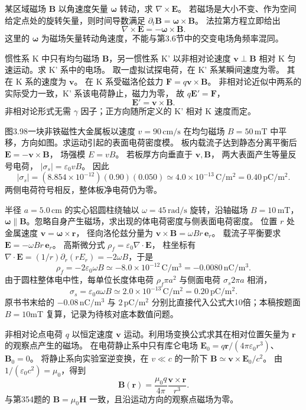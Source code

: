 某区域磁场 $\bm B$ 以角速度矢量 $\bm\omega$ 转动，求 $\nabla\times\bm E$。
\exsolution
若磁场是大小不变、作为空间给定点处的旋转矢量，则时间导数满足
$\partial_t\bm B=\bm\omega\times\bm B$。
法拉第方程立即给出
\[
\boxed{\nabla\times\bm E
=-\bm\omega\times\bm B}.
\]
\excheck 这里的 $\bm\omega$ 为磁场矢量转动角速度，不能与第3.6节中的交变电场角频率混同。

惯性系 K 中只有均匀磁场 $\bm B$，另一惯性系 K' 以非相对论速度 $\bm v\perp\bm B$ 相对 K 匀速运动。求 K' 系中的电场。
\exsolution
取一虚拟试探电荷，在 K' 系某瞬间速度为零。
其在 K 系的速度为 $\bm v$。
在 K 系受磁洛伦兹力
$\bm F=q\bm v\times\bm B$。
非相对论近似中两系的实际受力一致，K' 系该电荷静止，磁力为零，
故 $q\bm E'=\bm F$，
\[
\boxed{\bm E'=\bm v\times\bm B}.
\]
\excheck 非相对论形式无需 $\gamma$ 因子；正方向随所定义的 K' 相对 K 速度而定。

图3.98一块非铁磁性大金属板以速度
$v=90\,\mathrm{cm/s}$ 在均匀磁场
$B=50\,\mathrm{mT}$ 中平移，方向如图。求运动引起的表面电荷密度模。
\exsolution
板内载流子达到静态分离平衡后
$\bm E=-\bm v\times\bm B$，
场强模 $E=vB$。
若板厚方向垂直于 $\bm v,\bm B$，
两大表面产生等量反号电荷，
$|\sigma_s|=\varepsilon_0vB$。
因此
\[
\boxed{|\sigma_s|=
(8.854\times10^{-12})(0.90)(0.050)
\simeq4.0\times10^{-13}\,\mathrm{C/m^2}
=0.40\,\mathrm{pC/m^2}}.
\]
\excheck 两侧电荷符号相反，整体板净电荷仍为零。

半径 $a=5.0\,\mathrm{cm}$ 的实心铝圆柱绕轴以 $\omega=45\,\mathrm{rad/s}$ 旋转，沿轴磁场
$B=10\,\mathrm{mT}$，$\bm\omega\parallel\bm B$。忽略自身产生磁场，求出现的体电荷密度与侧表面电荷密度。
\exsolution
位置 $r$ 处金属速度
$\bm v=\bm\omega\times\bm r$，
径向洛伦兹分量为
$\bm v\times\bm B=\omega Br\,\bm e_r$。
载流子平衡要求
$\bm E=-\omega Br\,\bm e_r$。
高斯微分式
$\rho_f=\varepsilon_0\nabla\cdot\bm E$，
柱坐标有
$\nabla\cdot\bm E=(1/r)\partial_r(rE_r)
=-2\omega B$，于是
\[
\boxed{\rho_f=-2\varepsilon_0\omega B
\simeq-8.0\times10^{-12}\,\mathrm{C/m^3}
=-0.0080\,\mathrm{nC/m^3}}.
\]
由于圆柱整体电中性，每单位长度体电荷
$\rho_f\pi a^2$ 与侧面电荷
$\sigma_s2\pi a$ 相消，
\[
\boxed{\sigma_s=\varepsilon_0a\omega B
\simeq2.0\times10^{-13}\,\mathrm{C/m^2}
=0.20\,\mathrm{pC/m^2}}.
\]
\excheck 原书书末给的 $-0.08\,\mathrm{nC/m^3}$ 与 $2\,\mathrm{pC/m^2}$ 分别比直接代入公式大10倍；本稿按题面 $B=10$mT 复算，记录为待核对底本数值问题。

非相对论点电荷 $q$ 以恒定速度 $\bm v$ 运动。利用场变换公式求其在相对位置矢量为 $\bm r$ 的观察点产生的磁场。
\exsolution
在电荷静止系中只有库仑电场
$\bm E_0=q\bm r/(4\pi\varepsilon_0r^3)$、$\bm B_0=0$。
将静止系向实验室逆变换，在 $v\ll c$ 的一阶下
$\bm B\simeq\bm v\times\bm E_0/c^2$。
由 $1/(\varepsilon_0c^2)=\mu_0$，得到
\[
\boxed{\bm B(\bm r)=
\frac{\mu_0q}{4\pi}\frac{\bm v\times\bm r}{r^3}}.
\]
\excheck 与第354题的 $\bm B=\mu_0\bm H$ 一致，且沿运动方向的观察点磁场为零。

